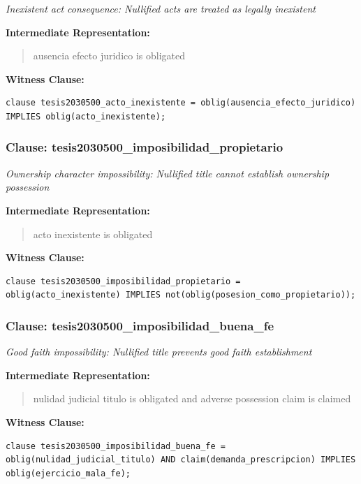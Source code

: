 \documentclass[11pt,a4paper]{article}
\begin{document}
\textit{Inexistent act consequence: Nullified acts are treated as legally inexistent}

\textbf{Intermediate Representation:}

\begin{quote}
ausencia efecto juridico is obligated
\end{quote}

\textbf{Witness Clause:}

\begin{lstlisting}[style=witnessstyle, language=Witness]
clause tesis2030500_acto_inexistente = oblig(ausencia_efecto_juridico) IMPLIES oblig(acto_inexistente);
\end{lstlisting}

\subsubsection{Clause: tesis2030500\_imposibilidad\_propietario}

\textit{Ownership character impossibility: Nullified title cannot establish ownership possession}

\textbf{Intermediate Representation:}

\begin{quote}
acto inexistente is obligated
\end{quote}

\textbf{Witness Clause:}

\begin{lstlisting}[style=witnessstyle, language=Witness]
clause tesis2030500_imposibilidad_propietario = oblig(acto_inexistente) IMPLIES not(oblig(posesion_como_propietario));
\end{lstlisting}

\subsubsection{Clause: tesis2030500\_imposibilidad\_buena\_fe}

\textit{Good faith impossibility: Nullified title prevents good faith establishment}

\textbf{Intermediate Representation:}

\begin{quote}
nulidad judicial titulo is obligated and adverse possession claim is claimed
\end{quote}

\textbf{Witness Clause:}

\begin{lstlisting}[style=witnessstyle, language=Witness]
clause tesis2030500_imposibilidad_buena_fe = oblig(nulidad_judicial_titulo) AND claim(demanda_prescripcion) IMPLIES oblig(ejercicio_mala_fe);
\end{lstlisting}
\end{document}
